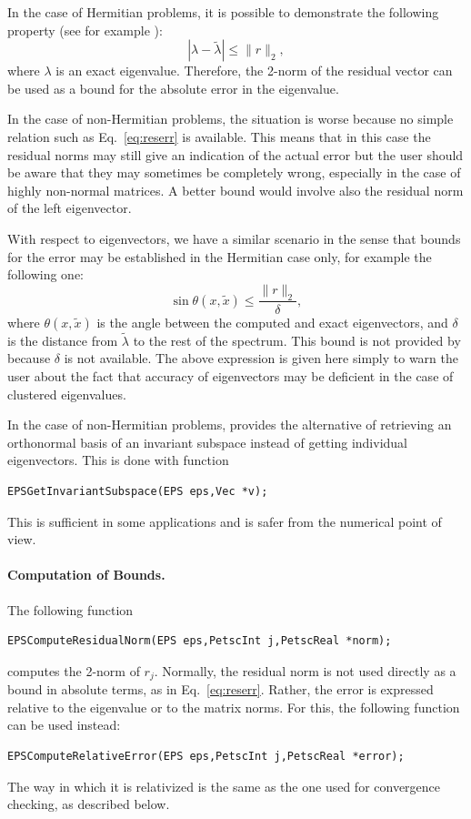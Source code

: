 	In the case of Hermitian problems, it is possible to demonstrate the following property (see for example \citep[ch. 3]{Saad:1992:NML}):
\begin{equation}\label{eq:reserr}
|\lambda-\tilde{\lambda}|\leq \|r\|_2,
\end{equation}
where $\lambda$ is an exact eigenvalue. Therefore, the 2-norm of the residual vector can be used as a bound for the absolute error in the eigenvalue.

	In the case of non-Hermitian problems, the situation is worse because no simple relation such as Eq.\ \ref{eq:reserr} is available. This means that in this case the residual norms may still give an indication of the actual error but the user should be aware that they may sometimes be completely wrong, especially in the case of highly non-normal matrices. A better bound would involve also the residual norm of the left eigenvector.

	With respect to eigenvectors, we have a similar scenario in the sense that bounds for the error may be established in the Hermitian case only, for example the following one:
\begin{equation}
\sin \theta(x,\tilde{x})\leq \frac{\|r\|_2}{\delta},
\end{equation}
where $\theta(x,\tilde{x})$ is the angle between the computed and exact eigenvectors, and $\delta$ is the distance from $\tilde{\lambda}$ to the rest of the spectrum. This bound is not provided by \slepc because $\delta$ is not available. The above expression is given here simply to warn the user about the fact that accuracy of eigenvectors may be deficient in the case of clustered eigenvalues.

	In the case of non-Hermitian problems, \slepc provides the alternative of retrieving an orthonormal basis of an invariant subspace instead of getting individual eigenvectors. This is done with function
	\begin{Verbatim}[fontsize=\small]
	EPSGetInvariantSubspace(EPS eps,Vec *v);
	\end{Verbatim}
This is sufficient in some applications and is safer from the numerical point of view.

\paragraph{Computation of Bounds.}
The following \slepc function 
	\begin{Verbatim}[fontsize=\small]
	EPSComputeResidualNorm(EPS eps,PetscInt j,PetscReal *norm);
	\end{Verbatim}
computes the 2-norm of $r_j$. Normally, the residual norm is not used directly as a bound in absolute terms, as in Eq.\ \ref{eq:reserr}. Rather, the error is expressed relative to the eigenvalue or to the matrix norms. For this, the following function can be used instead:
	\begin{Verbatim}[fontsize=\small]
	EPSComputeRelativeError(EPS eps,PetscInt j,PetscReal *error);
	\end{Verbatim}
The way in which it is relativized is the same as the one used for convergence checking, as described below.

